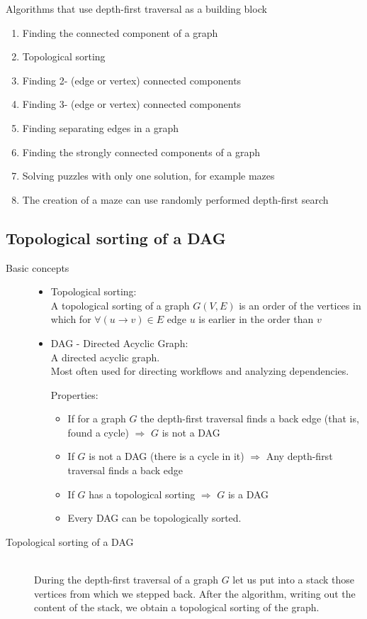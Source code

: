 \documentclass[margin=0px]{article}
\begin{document}
Algorithms that use depth-first traversal as a building block
\begin{enumerate}
	\item Finding the connected component of a graph
	\item Topological sorting
	\item Finding 2- (edge or vertex) connected components
	\item Finding 3- (edge or vertex) connected components
	\item Finding separating edges in a graph
	\item Finding the strongly connected components of a graph
	\item Solving puzzles with only one solution, for example mazes
	\item The creation of a maze can use randomly performed depth-first search
\end{enumerate}
\subsection{Topological sorting of a DAG}
\begin{description}
    \item[Basic concepts] \hfill
        \begin{itemize}
            \item Topological sorting: \\
                  A topological sorting of a graph $G(V,E)$ is an order of the vertices in which for $\forall (u\rightarrow v) \in E$ edge $u$ is earlier in the order than $v$
            \item DAG - Directed Acyclic Graph: \\
                  A directed acyclic graph. \\
                  Most often used for directing workflows and analyzing dependencies.

                  Properties:
                  \begin{itemize}
                      \item If for a graph $G$ the depth-first traversal finds a back edge (that is, found a cycle) $\Longrightarrow$ $G$ is not a DAG
                      \item If $G$ is not a DAG (there is a cycle in it) $\Longrightarrow$ Any depth-first traversal finds a back edge
                      \item If $G$ has a topological sorting $\Longrightarrow$ $G$ is a DAG
                      \item Every DAG can be topologically sorted.
                  \end{itemize}
        \end{itemize}
    \item[Topological sorting of a DAG] \hfill \\
        During the depth-first traversal of a graph $G$ let us put into a stack those vertices from which we stepped back. After the algorithm, writing out the content of the stack, we obtain a topological sorting of the graph.
\end{description}
\end{document}
